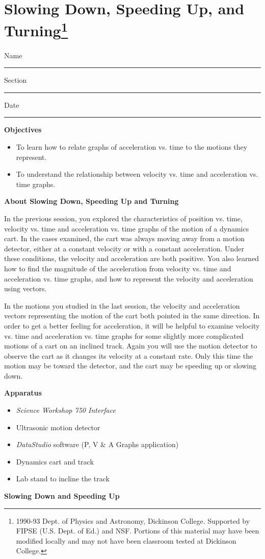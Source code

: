 
\section{Slowing Down, Speeding Up, and Turning\footnote{
1990-93 Dept. of Physics and Astronomy, Dickinson College. Supported by FIPSE
(U.S. Dept. of Ed.) and NSF. Portions of this material may have been modified
locally and may not have been classroom tested at Dickinson College.
}}

Name \rule{2.0in}{0.1pt}\hfill{}Section \rule{1.0in}{0.1pt}\hfill{}Date \rule{1.0in}{0.1pt}

\textbf{Objectives }

\begin{itemize}
\item To learn how to relate graphs of acceleration vs. time to the motions they represent. 
\item To understand the relationship between velocity vs. time and acceleration vs.
time graphs.
\end{itemize}
\textbf{About Slowing Down, Speeding Up and Turning }

In the previous session, you explored the characteristics of position vs. time,
velocity vs. time and acceleration vs. time graphs of the motion of a dynamics
cart. In the cases examined, the cart was always moving away from a motion detector,
either at a constant velocity or with a constant acceleration. Under these conditions,
the velocity and acceleration are both positive. You also learned how to find
the magnitude of the acceleration from velocity vs. time and acceleration vs.
time graphs, and how to represent the velocity and acceleration using vectors. 

In the motions you studied in the last session, the velocity and acceleration
vectors representing the motion of the cart both pointed in the same direction.
In order to get a better feeling for acceleration, it will be helpful to examine
velocity vs. time and acceleration vs. time graphs for some slightly more complicated
motions of a cart on an inclined track. Again you will use the motion detector
to observe the cart as it changes its velocity at a constant rate. Only this
time the motion may be toward the detector, and the cart may be speeding up
or slowing down.

\textbf{Apparatus }

\begin{itemize}
\item \textit{Science Workshop 750 Interface}
\item Ultrasonic motion detector 
\item \textit{DataStudio} software (P, V \& A Graphs application)
\item Dynamics cart and track 
\item Lab stand to incline the track
\end{itemize}
\textbf{Slowing Down and Speeding Up }

